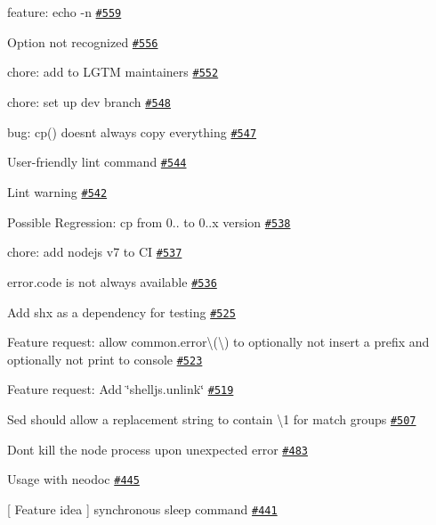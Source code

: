 \begin{DoxyItemize}
\item feature\+: echo -\/n \href{https://github.com/shelljs/shelljs/issues/559}{\tt \#559}
\item Option not recognized \href{https://github.com/shelljs/shelljs/issues/556}{\tt \#556}
\item chore\+: add  to L\+G\+TM maintainers \href{https://github.com/shelljs/shelljs/issues/552}{\tt \#552}
\item chore\+: set up dev branch \href{https://github.com/shelljs/shelljs/issues/548}{\tt \#548}
\item bug\+: cp() doesn\textquotesingle{}t always copy everything \href{https://github.com/shelljs/shelljs/issues/547}{\tt \#547}
\item User-\/friendly lint command \href{https://github.com/shelljs/shelljs/issues/544}{\tt \#544}
\item Lint warning \href{https://github.com/shelljs/shelljs/issues/542}{\tt \#542}
\item Possible Regression\+: cp from 0.. to 0..\+x version \href{https://github.com/shelljs/shelljs/issues/538}{\tt \#538}
\item chore\+: add nodejs v7 to CI \href{https://github.com/shelljs/shelljs/issues/537}{\tt \#537}
\item error.\+code is not always available \href{https://github.com/shelljs/shelljs/issues/536}{\tt \#536}
\item Add shx as a dependency for testing \href{https://github.com/shelljs/shelljs/issues/525}{\tt \#525}
\item Feature request\+: allow {\ttfamily common.\+error\textbackslash{}(\textbackslash{})} to optionally not insert a prefix and optionally not print to console \href{https://github.com/shelljs/shelljs/issues/523}{\tt \#523}
\item Feature request\+: Add \char`\"{}shelljs.\+unlink\char`\"{} \href{https://github.com/shelljs/shelljs/issues/519}{\tt \#519}
\item Sed should allow a replacement string to contain {\ttfamily \textbackslash{}1} for match groups \href{https://github.com/shelljs/shelljs/issues/507}{\tt \#507}
\item Don\textquotesingle{}t kill the node process upon unexpected error \href{https://github.com/shelljs/shelljs/issues/483}{\tt \#483}
\item Usage with neodoc \href{https://github.com/shelljs/shelljs/issues/445}{\tt \#445}
\item \mbox{[} Feature idea \mbox{]} synchronous sleep command \href{https://github.com/shelljs/shelljs/issues/441}{\tt \#441}

\end{DoxyItemize}
